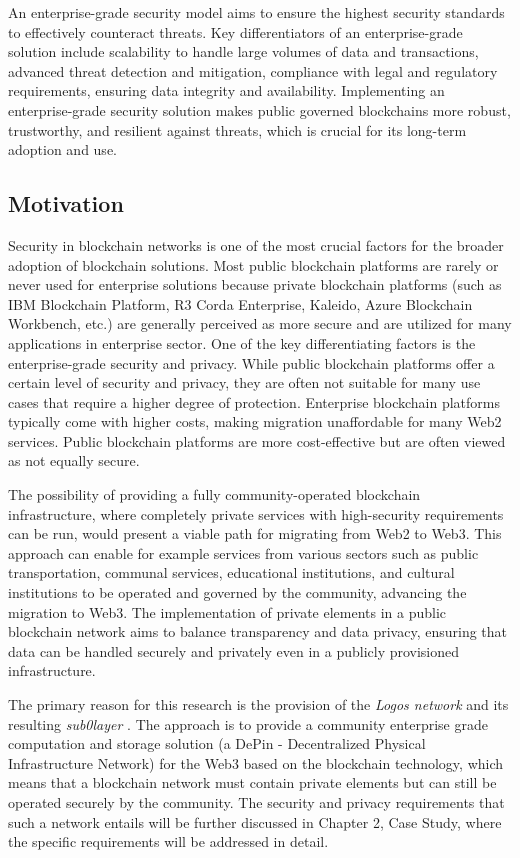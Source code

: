 An enterprise-grade security model aims to ensure the highest security standards to effectively counteract threats. Key differentiators of an enterprise-grade solution include scalability to handle large volumes of data and transactions, advanced threat detection and mitigation, compliance with legal and regulatory requirements, ensuring data integrity and availability. Implementing an enterprise-grade security solution makes public governed blockchains more robust, trustworthy, and resilient against threats, which is crucial for its long-term adoption and use.

\subsection{Motivation}
Security in blockchain networks is one of the most crucial factors for the broader adoption of blockchain solutions. Most public blockchain platforms are rarely or never used for enterprise solutions because private blockchain platforms (such as IBM Blockchain Platform, R3 Corda Enterprise, Kaleido, Azure Blockchain Workbench, etc.) are generally perceived as more secure and are utilized for many applications in enterprise sector. One of the key differentiating factors is the enterprise-grade security and privacy. While public blockchain platforms offer a certain level of security and privacy, they are often not suitable for many use cases that require a higher degree of protection. Enterprise blockchain platforms typically come with higher costs, making migration unaffordable for many Web2 services. Public blockchain platforms are more cost-effective but are often viewed as not equally secure.

The possibility of providing a fully community-operated blockchain infrastructure, where completely private services with high-security requirements can be run, would present a viable path for migrating from Web2 to Web3. This approach can enable for example services from various sectors such as public transportation, communal services, educational institutions, and cultural institutions to be operated and governed by the community, advancing the migration to Web3. The implementation of private elements in a public blockchain network aims to balance transparency and data privacy, ensuring that data can be handled securely and privately even in a publicly provisioned infrastructure.

The primary reason for this research is the provision of the \textit{Logos network} \cite{AboutLogosNetworkDocs} and its resulting \textit{sub0layer} \cite{sub0layerBlog}. The approach is to provide a community enterprise grade computation and storage solution (a DePin - Decentralized Physical Infrastructure Network) for the Web3 based on the blockchain technology, which means that a blockchain network must contain private elements but can still be operated securely by the community. The security and privacy requirements that such a network entails will be further discussed in Chapter 2, Case Study, where the specific requirements will be addressed in detail.

